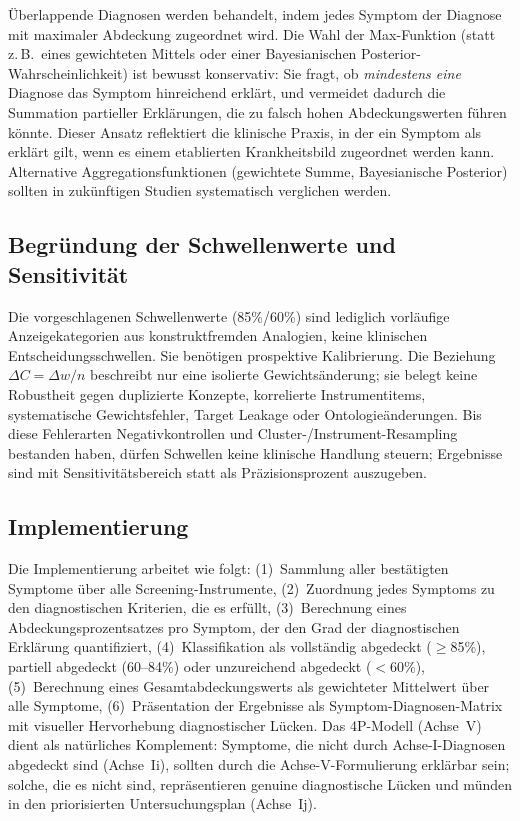 \documentclass[11pt,a4paper]{article}
\begin{document}
\"Uberlappende Diagnosen werden behandelt, indem jedes Symptom der Diagnose mit maximaler Abdeckung zugeordnet wird. Die Wahl der Max-Funktion (statt z.\,B.\ eines gewichteten Mittels oder einer Bayesianischen Posterior-Wahrscheinlichkeit) ist bewusst konservativ: Sie fragt, ob \textit{mindestens eine} Diagnose das Symptom hinreichend erkl\"art, und vermeidet dadurch die Summation partieller Erkl\"arungen, die zu falsch hohen Abdeckungswerten f\"uhren k\"onnte. Dieser Ansatz reflektiert die klinische Praxis, in der ein Symptom als \glqq erkl\"art\grqq{} gilt, wenn es einem etablierten Krankheitsbild zugeordnet werden kann. Alternative Aggregationsfunktionen (gewichtete Summe, Bayesianische Posterior) sollten in zuk\"unftigen Studien systematisch verglichen werden.

\subsection{Begr\"undung der Schwellenwerte und Sensitivit\"at}

Die vorgeschlagenen Schwellenwerte (85\%/60\%) sind lediglich vorl\"aufige Anzeigekategorien aus konstruktfremden Analogien, keine klinischen Entscheidungsschwellen. Sie ben\"otigen prospektive Kalibrierung. Die Beziehung $\Delta C=\Delta w/n$ beschreibt nur eine isolierte Gewichts\"anderung; sie belegt keine Robustheit gegen duplizierte Konzepte, korrelierte Instrumentitems, systematische Gewichtsfehler, Target Leakage oder Ontologie\"anderungen. Bis diese Fehlerarten Negativkontrollen und Cluster-/Instrument-Resampling bestanden haben, d\"urfen Schwellen keine klinische Handlung steuern; Ergebnisse sind mit Sensitivit\"atsbereich statt als Pr\"azisionsprozent auszugeben.

\subsection{Implementierung}

Die Implementierung arbeitet wie folgt: (1)~Sammlung aller best\"atigten Symptome \"uber alle Screening-Instrumente, (2)~Zuordnung jedes Symptoms zu den diagnostischen Kriterien, die es erf\"ullt, (3)~Berechnung eines Abdeckungsprozentsatzes pro Symptom, der den Grad der diagnostischen Erkl\"arung quantifiziert, (4)~Klassifikation als vollst\"andig abgedeckt ($\geq$85\%), partiell abgedeckt (60--84\%) oder unzureichend abgedeckt ($<$60\%), (5)~Berechnung eines Gesamtabdeckungswerts als gewichteter Mittelwert \"uber alle Symptome, (6)~Pr\"asentation der Ergebnisse als Symptom-Diagnosen-Matrix mit visueller Hervorhebung diagnostischer L\"ucken. Das 4P-Modell (Achse~V) dient als nat\"urliches Komplement: Symptome, die nicht durch Achse-I-Diagnosen abgedeckt sind (Achse~Ii), sollten durch die Achse-V-Formulierung erkl\"arbar sein; solche, die es nicht sind, repr\"asentieren genuine diagnostische L\"ucken und m\"unden in den priorisierten Untersuchungsplan (Achse~Ij).
\end{document}
